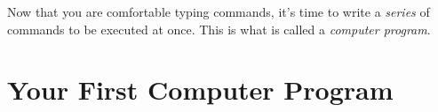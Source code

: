 \vspace{16pt}

Now that you are comfortable typing commands, it's time to write a
\emph{series} of commands to be executed at once.  This is what is called a
\emph{computer program}.


\chapter{Your First Computer Program}

\@openrighttrue\makeatother
